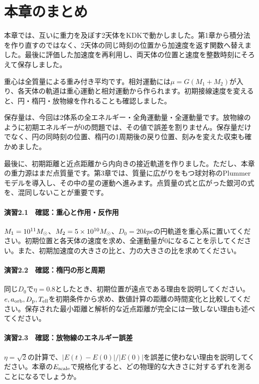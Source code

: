 \section{本章のまとめ}
\label{sec:ch2-summary}
本章では、互いに重力を及ぼす2天体をKDKで動かしました。第1章から積分法を作り直すのではなく、2天体の同じ時刻の位置から加速度を返す関数へ替えました。最後に評価した加速度を再利用し、両天体の位置と速度を整数時刻にそろえて保存しました。

重心は全質量による重み付き平均です。相対運動には$\mu=G(M_1+M_2)$が入り、各天体の軌道は重心運動と相対運動から作られます。初期接線速度を変えると、円・楕円・放物線を作れることも確認しました。

保存量は、今回は2体系の全エネルギー・全角運動量・全運動量です。放物線のように初期エネルギーが0の問題では、その値で誤差を割りません。保存量だけでなく、円の同時刻の位置、楕円の1周期後の戻り位置、刻みを変えた収束も確かめました。

最後に、初期距離と近点距離から内向きの接近軌道を作りました。ただし、本章の重力源はまだ点質量です。第3章では、質量に広がりをもつ球対称のPlummerモデルを導入し、その中の星の運動へ進みます。点質量の式と広がった銀河の式を、混同しないことが重要です。

\chapterexercises
\paragraph{演習2.1　確認：重心と作用・反作用}
$M_1=10^{11}M_\odot$、$M_2=5\times10^{10}M_\odot$、$D_0=20\unit{kpc}$の円軌道を重心系に置いてください。初期位置と各天体の速度を求め、全運動量が0になることを示してください。また、初期加速度の大きさの比と、力の大きさの比を求めてください。

\paragraph{演習2.2　確認：楕円の形と周期}
同じ$D_0$で$\eta=0.8$としたとき、初期位置が遠点である理由を説明してください。$e,a_{\rm orb},D_{\rm p},T_{\rm ell}$を初期条件から求め、数値計算の距離の時間変化と比較してください。保存された最小距離と解析的な近点距離が完全には一致しない理由も述べてください。

\paragraph{演習2.3　確認：放物線のエネルギー誤差}
$\eta=\sqrt{2}$の計算で、$|E(t)-E(0)|/|E(0)|$を誤差に使わない理由を説明してください。本章の$E_{\rm scale}$で規格化すると、どの物理的な大きさに対するずれを測ることになるでしょうか。

